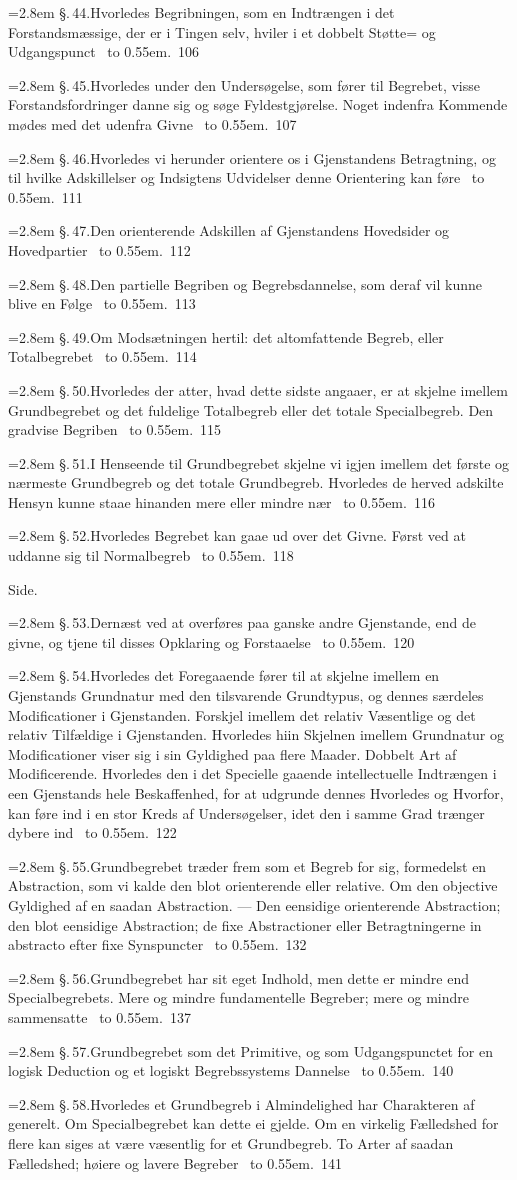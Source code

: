 \documentclass[12pt]{book}
\def\textit#1{#1}%
\newcommand{\ovside}{\par\nopagebreak\hfill{\footnotesize Side.}\par\nobreak\vspace{0.2\baselineskip}}
\newcommand{\ovline}[3]{%
  \par\vspace{0.25\baselineskip}%
  \noindent\hangindent=2.8em\hangafter=1
  \textit{\S.\,#1.}\quad #2%
  \nobreak\ \leaders\hbox to 0.55em{\hss.\hss}\hfill\ \textit{#3}\par}
\begin{document}
\ovline{44}{Hvorledes Begribningen, som en Indtrængen i det Forstandsmæssige,
  der er i Tingen selv, hviler i et dobbelt Støtte= og Udgangspunct}{106}
\ovline{45}{Hvorledes under den Undersøgelse, som fører til Begrebet, visse
  Forstandsfordringer danne sig og søge Fyldestgjørelse. Noget indenfra
  Kommende mødes med det udenfra Givne}{107}
\ovline{46}{Hvorledes vi herunder orientere os i Gjenstandens Betragtning, og
  til hvilke Adskillelser og Indsigtens Udvidelser denne Orientering kan
  føre}{111}
\ovline{47}{Den orienterende Adskillen af Gjenstandens Hovedsider og
  Hovedpartier}{112}
\ovline{48}{Den partielle Begriben og Begrebsdannelse, som deraf vil kunne
  blive en Følge}{113}
\ovline{49}{Om Modsætningen hertil: det altomfattende Begreb, eller
  Totalbegrebet}{114}
\ovline{50}{Hvorledes der atter, hvad dette sidste angaaer, er at skjelne
  imellem Grundbegrebet og det fuldelige Totalbegreb eller det totale
  Specialbegreb. Den gradvise Begriben}{115}
\ovline{51}{I Henseende til Grundbegrebet skjelne vi igjen imellem det første
  og nærmeste Grundbegreb og det totale Grundbegreb. Hvorledes de herved
  adskilte Hensyn kunne staae hinanden mere eller mindre nær}{116}
\ovline{52}{Hvorledes Begrebet kan gaae ud over det Givne. Først ved at
  uddanne sig til Normalbegreb}{118}

\ovside
\ovline{53}{Dernæst ved at overføres paa ganske andre Gjenstande, end de
  givne, og tjene til disses Opklaring og Forstaaelse}{120}
\ovline{54}{Hvorledes det Foregaaende fører til at skjelne imellem en
  Gjenstands Grundnatur med den tilsvarende Grundtypus, og dennes særdeles
  Modificationer i Gjenstanden. Forskjel imellem det relativ Væsentlige og det
  relativ Tilfældige i Gjenstanden. Hvorledes hiin Skjelnen imellem Grundnatur
  og Modificationer viser sig i sin Gyldighed paa flere Maader. Dobbelt Art af
  Modificerende. Hvorledes den i det Specielle gaaende intellectuelle
  Indtrængen i een Gjenstands hele Beskaffenhed, for at udgrunde dennes
  Hvorledes og Hvorfor, kan føre ind i en stor Kreds af Undersøgelser, idet den
  i samme Grad trænger dybere ind}{122}
\ovline{55}{Grundbegrebet træder frem som et Begreb for sig, formedelst en
  Abstraction, som vi kalde den blot orienterende eller relative. Om den
  objective Gyldighed af en saadan Abstraction. --- Den eensidige orienterende
  Abstraction; den blot eensidige Abstraction; de fixe Abstractioner eller
  Betragtningerne \textit{in abstracto} efter fixe Synspuncter}{132}
\ovline{56}{Grundbegrebet har sit eget Indhold, men dette er mindre end
  Specialbegrebets. Mere og mindre fundamentelle Begreber; mere og mindre
  sammensatte}{137}
\ovline{57}{Grundbegrebet som det Primitive, og som Udgangspunctet for en
  logisk Deduction og et logiskt Begrebssystems Dannelse}{140}
\ovline{58}{Hvorledes et Grundbegreb i Almindelighed har Charakteren af
  generelt. Om Specialbegrebet kan dette ei gjelde. Om en virkelig Fælledshed
  for flere kan siges at være væsentlig for et Grundbegreb. To Arter af saadan
  Fælledshed; høiere og lavere Begreber}{141}
\end{document}
